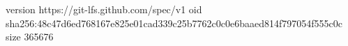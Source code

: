 version https://git-lfs.github.com/spec/v1
oid sha256:48c47d6ed768167e825e01cad339c25b7762c0c0e6baaed814f797054f555c0c
size 365676

